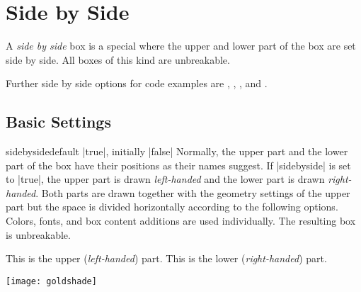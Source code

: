 \clearpage
\section{Side by Side}\label{sec:sidebyside}%
%

A \emph{side by side} box is a special  where
the upper and lower part of the box are set side by side.
All boxes of this kind are unbreakable.

\begin{marker}
  Further side by side options for code examples are
  ,
  ,
  , and
  .
\end{marker}

\subsection{Basic Settings}\label{subsec:sidebyside_basic}

\begin{docTcbKey}{sidebyside}{}{default |true|, initially |false|}
Normally, the upper part and the lower part of the box have their positions
as their names suggest. If |sidebyside| is set to |true|, the upper part
is drawn \emph{left-handed} and the lower part is drawn \emph{right-handed}.
Both parts are drawn together with the geometry settings of the upper part but the
space is divided horizontally according to the following options.
Colors, fonts, and box content additions are used individually.
The resulting box is unbreakable.

\begin{dispExample}

\begin{tcolorbox}[title=My title,sidebyside]
  This is the upper (\textit{left-handed}) part.
\tcblower
  This is the lower (\textit{right-handed}) part.
\end{tcolorbox}
\end{dispExample}


\begin{dispExample}
\begin{tcolorbox}[bicolor,sidebyside,righthand width=3cm,
    sharp corners,boxrule=.4pt,colback=green!5,colbacklower=green!50!black!50]
  \lipsum[2]
\tcblower
  \texttt{[image: goldshade]}%
\end{tcolorbox}
\end{dispExample}
\end{docTcbKey}



